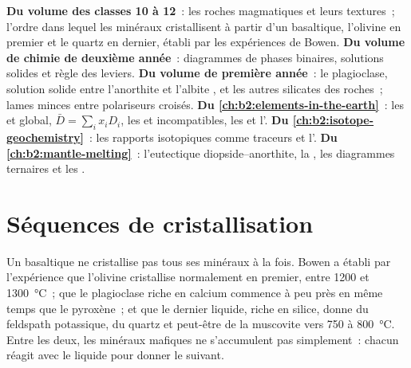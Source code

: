 \begin{recall}
\textbf{Du volume des classes 10 à 12}~: les roches magmatiques et leurs textures~; l'ordre dans lequel
les minéraux cristallisent à partir d'un  basaltique, l'olivine en premier et le quartz en dernier,
établi par les expériences de Bowen. \textbf{Du volume de chimie de deuxième année}~: diagrammes
de phases binaires, solutions solides et règle des leviers. \textbf{Du volume de première année}~:
le plagioclase, solution solide entre l'anorthite  et l'albite , et les
autres silicates des roches~; lames minces entre polariseurs croisés. \textbf{Du
\cref{ch:b2:elements-in-the-earth}}~: les  et global,
$\bar D = \sum_i x_i D_i$, les  et incompatibles, les 
et l'. \textbf{Du \cref{ch:b2:isotope-geochemistry}}~: les rapports
isotopiques comme traceurs et l'. \textbf{Du
\cref{ch:b2:mantle-melting}}~: l'eutectique diopside--anorthite, la , les diagrammes
ternaires et les .
\end{recall}

\section{Séquences de cristallisation}\label{sec:b2:magmatic-differentiation:sequences}

Un  basaltique ne cristallise pas tous ses minéraux à la fois. Bowen a établi par
l'expérience que l'olivine cristallise normalement en premier, entre 1200 et
\qty{1300}{\celsius}~; que le plagioclase riche en calcium commence à peu près en même temps que
le pyroxène~; et que le dernier liquide, riche en silice, donne du feldspath potassique, du quartz et
peut-être de la muscovite vers 750 à \qty{800}{\celsius}. Entre les deux, les minéraux mafiques
ne s'accumulent pas simplement~: chacun réagit avec le liquide pour donner le suivant.


